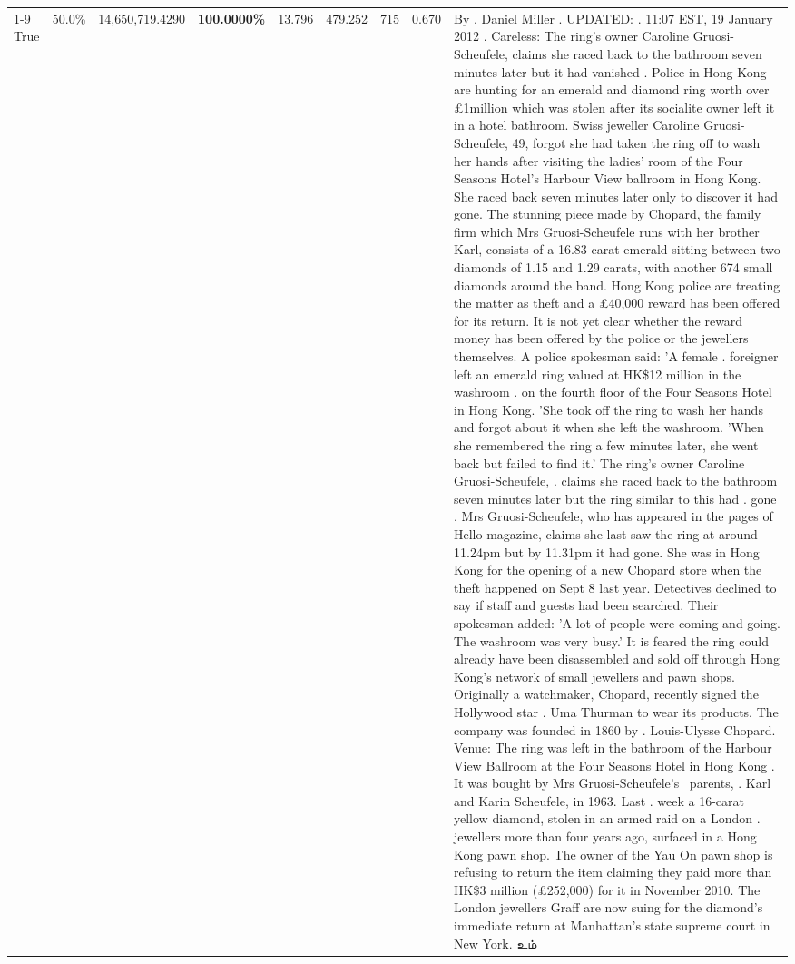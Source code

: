\begin{table}[H]
\begin{tabular}{lllrlllll}
\cline{1-9}
True & 50.0\% & 14,650,719.4290 & \bfseries \color{red} 100.0000\% & 13.796 & 479.252 & 715 & 0.670 & By . Daniel Miller . UPDATED: . 11:07 EST, 19 January 2012 . Careless: The ring's owner Caroline Gruosi-Scheufele, claims she raced back to the bathroom seven minutes later but it had vanished . Police in Hong Kong are hunting for an emerald and diamond ring worth over £1million which was stolen after its socialite owner left it in a hotel bathroom. Swiss jeweller Caroline Gruosi-Scheufele, 49, forgot she had taken the ring off to wash her hands after visiting the ladies' room of the Four Seasons Hotel's Harbour View ballroom in Hong Kong. She raced back seven minutes later only to discover it had gone. The stunning piece made by Chopard, the family firm which Mrs Gruosi-Scheufele runs with her brother Karl, consists of a 16.83 carat emerald sitting between two diamonds of 1.15 and 1.29 carats, with another 674 small diamonds around the band. Hong Kong police are treating the matter as theft and a £40,000 reward has been offered for its return. It is not yet clear whether the reward money has been offered by the police or the jewellers themselves. A police spokesman said: 'A female . foreigner left an emerald ring valued at HK\$12 million in the washroom . on the fourth floor of the Four Seasons Hotel in Hong Kong. 'She took off the ring to wash her hands and forgot about it when she left the washroom. 'When she remembered the ring a few minutes later, she went back but failed to find it.' The ring's owner Caroline Gruosi-Scheufele, . claims she raced back to the bathroom seven minutes later but the ring similar to this had . gone . Mrs Gruosi-Scheufele, who has appeared in the pages of Hello magazine, claims she last saw the ring at around 11.24pm but by 11.31pm it had gone. She was in Hong Kong for the opening of a new Chopard store when the theft happened on Sept 8 last year. Detectives declined to say if staff and guests had been searched. Their spokesman added: 'A lot of people were coming and going. The washroom was very busy.' It is feared the ring could already have been disassembled and sold off through Hong Kong's network of small jewellers and pawn shops. Originally a watchmaker, Chopard, recently signed the Hollywood star . Uma Thurman to wear its products. The company was founded in 1860 by . Louis-Ulysse Chopard. Venue: The ring was left in the bathroom of the Harbour View Ballroom at the Four Seasons Hotel in Hong Kong . It was bought by Mrs Gruosi-Scheufele's  parents, . Karl and Karin Scheufele, in 1963. Last . week a 16-carat yellow diamond, stolen in an armed raid on a London . jewellers more than four years ago, surfaced in a Hong Kong pawn shop. The owner of the Yau On pawn shop is refusing to return the item claiming they paid more than HK\$3 million (£252,000) for it in November 2010. The London jewellers Graff are now suing for the diamond’s immediate return at Manhattan’s state supreme court in New York. உம் \\

\end{tabular}
\end{table}
